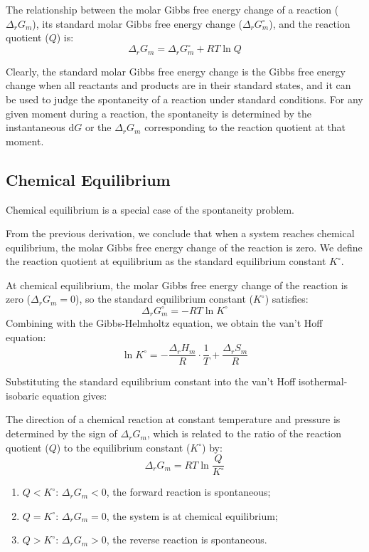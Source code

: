 \begin{proposition}
The relationship between the molar Gibbs free energy change of a reaction ($\Delta_r G_m$), its standard molar Gibbs free energy change ($\Delta_r G_m^\circ$), and the reaction quotient ($Q$) is:
$$\Delta_r G_m = \Delta_r G_m^\circ + RT\ln Q$$
\end{proposition}

Clearly, the standard molar Gibbs free energy change is the Gibbs free energy change when all reactants and products are in their standard states, and it can be used to judge the spontaneity of a reaction under standard conditions. For any given moment during a reaction, the spontaneity is determined by the instantaneous $\mathrm{d}G$ or the $\Delta_r G_m$ corresponding to the reaction quotient at that moment.

\subsection{Chemical Equilibrium}

Chemical equilibrium is a special case of the spontaneity problem.

From the previous derivation, we conclude that when a system reaches chemical equilibrium, the molar Gibbs free energy change of the reaction is zero. We define the reaction quotient at equilibrium as the standard equilibrium constant $K^\circ$.

\begin{proposition}
At chemical equilibrium, the molar Gibbs free energy change of the reaction is zero ($\Delta_r G_m=0$), so the standard equilibrium constant ($K^\circ$) satisfies:
$$\Delta_r G_m^\circ = -RT\ln K^\circ$$
Combining with the Gibbs-Helmholtz equation, we obtain the van't Hoff equation:
$$\ln K^\circ = -\frac{\Delta_r H_m}{R} \cdot \frac{1}{T} + \frac{\Delta_r S_m}{R}$$
\end{proposition}

Substituting the standard equilibrium constant into the van’t Hoff isothermal-isobaric equation gives:

\begin{proposition}
The direction of a chemical reaction at constant temperature and pressure is determined by the sign of $\Delta_r G_m$, which is related to the ratio of the reaction quotient ($Q$) to the equilibrium constant ($K^\circ$) by:
$$\Delta_r G_m = RT\ln\frac{Q}{K^\circ}$$
\begin{enumerate}
    \item $Q < K^\circ$: $\Delta_r G_m < 0$, the forward reaction is spontaneous;
    \item $Q = K^\circ$: $\Delta_r G_m = 0$, the system is at chemical equilibrium;
    \item $Q > K^\circ$: $\Delta_r G_m > 0$, the reverse reaction is spontaneous.
\end{enumerate}
\end{proposition}

